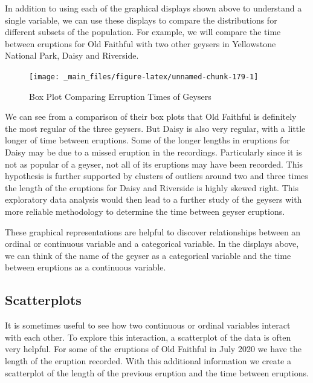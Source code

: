 \documentclass[
]{book}
\theoremstyle{definition}
\theoremstyle{definition}
\theoremstyle{definition}
\theoremstyle{definition}
\theoremstyle{remark}
\begin{document}
In addition to using each of the graphical displays shown above to understand a single variable, we can use these displays to compare the distributions for different subsets of the population. For example, we will compare the time between eruptions for Old Faithful with two other geysers in Yellowstone National Park, Daisy and Riverside.

\begin{figure}

{\centering \texttt{[image: \_main\_files/figure-latex/unnamed-chunk-179-1]} 

}

\caption{Box Plot Comparing Erruption Times of Geysers}\label{fig:unnamed-chunk-179}
\end{figure}

We can see from a comparison of their box plots that Old Faithful is definitely the most regular of the three geysers. But Daisy is also very regular, with a little longer of time between eruptions. Some of the longer lengths in eruptions for Daisy may be due to a missed eruption in the recordings. Particularly since it is not as popular of a geyser, not all of its eruptions may have been recorded. This hypothesis is further supported by clusters of outliers around two and three times the length of the eruptions for Daisy and Riverside is highly skewed right. This exploratory data analysis would then lead to a further study of the geysers with more reliable methodology to determine the time between geyser eruptions.

These graphical representations are helpful to discover relationships between an ordinal or continuous variable and a categorical variable. In the displays above, we can think of the name of the geyser as a categorical variable and the time between eruptions as a continuous variable.

\hypertarget{scatterplots}{%
\subsection{Scatterplots}\label{scatterplots}}

It is sometimes useful to see how two continuous or ordinal variables interact with each other. To explore this interaction, a scatterplot of the data is often very helpful. For some of the eruptions of Old Faithful in July 2020 we have the length of the eruption recorded. With this additional information we create a scatterplot of the length of the previous eruption and the time between eruptions.
\end{document}
